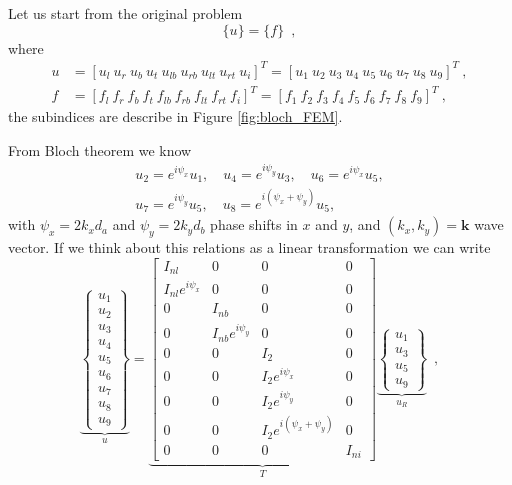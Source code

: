 Let us start from the original problem
\begin{equation}
[K-\omega^2 M]\lbrace u\rbrace = \lbrace f\rbrace \enspace ,
\label{eq:discrete_system}
\end{equation}
where
\begin{align*}
u &= [u_l\ u_r\ u_b\ u_t\ u_{lb}\ u_{rb}\ u_{lt}\ u_{rt}\ u_{i}]^T = [ u_1\ u_2\ u_3\ u_4\ u_5\ u_6\ u_7\ u_8\ u_9]^T\ , \\
f &= [f_l\ f_r\ f_b\ f_t\ f_{lb}\ f_{rb}\ f_{lt}\ f_{rt}\ f_{i}]^T = [ f_1\ f_2\ f_3\ f_4\ f_5\ f_6\ f_7\ f_8\ f_9]^T\ ,
\end{align*}
the subindices are describe in Figure \ref{fig:bloch_FEM}.

From Bloch theorem we know
\begin{align*}
u_2 = e^{i \psi_x}u_1, \quad u_4 = e^{i \psi_y}u_3,\quad u_6 = e^{i \psi_x}u_5, \\
u_7 = e^{i \psi_y}u_5,\quad u_8 = e^{i (\psi_x + \psi_y)}u_5,
\end{align*}
with $\psi_x = 2 k_x d_a $ and $\psi_y = 2 k_y d_b $ phase shifts in $x$ and $y$, and $(k_x,k_y)=\mathbf{k}$ wave vector. If we think about this relations as a linear transformation we can write
\begin{equation}
\underbrace{\left\lbrace  \begin{array}{c}
u_1 \\ 
u_2 \\ 
u_3 \\ 
u_4 \\ 
u_5 \\ 
u_6 \\ 
u_7 \\ 
u_8 \\ 
u_9
\end{array}  \right\rbrace }_{u} = 
\underbrace{\left[ \begin{array}{cccc}
I_{nl} & 0 & 0 & 0 \\ 
I_{nl} e^{i\psi_x} & 0 & 0 & 0 \\ 
0 & I_{nb} & 0 & 0 \\ 
0 & I_{nb} e^{i\psi_y} & 0 & 0 \\ 
0 & 0 & I_2 & 0 \\ 
0 & 0 & I_2 e^{i\psi_x} & 0 \\ 
0 & 0 & I_2 e^{i\psi_y} & 0 \\ 
0 & 0 & I_2 e^{i(\psi_x + \psi_y)} & 0 \\ 
0 & 0 & 0 & I_{ni}
\end{array} \right] }_{T}
\underbrace{\left\lbrace \begin{array}{c}
u_1 \\ 
u_3 \\ 
u_5 \\ 
u_9
\end{array} 
\right\rbrace }_{u_R} \enspace ,
\label{eq:disp_transformation}
\end{equation}
